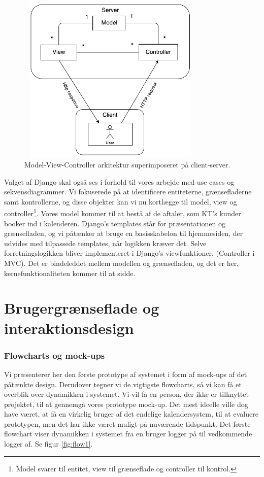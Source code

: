 \documentclass[12pt]{article}   %
\begin{document}
\begin{figure}[!ht]
	\centering
\includegraphics[width=9cm, height=8cm]{mvc.pdf}
\caption{Model-View-Controller arkitektur superimposeret på client-server.}
\label{fig:mvc}
\end{figure}

Valget af Django skal også ses i forhold til vores arbejde med use cases og sekvensdiagrammer. Vi fokuserede på at identificere entiteterne, grænsefladerne samt kontrollerne, og disse objekter kan vi nu kortlægge til model, view og controller\footnote{Model svarer til entitet, view til grænseflade og controller til kontrol.}. Vores model kommer til at bestå af de aftaler, som KT's kunder booker ind i kalenderen. Django's templates står for præsentationen og grænsefladen, og vi påtænker at bruge en basisskabelon til hjemmesiden, der udvides med tilpassede templates, når logikken kræver det. Selve forretningslogikken bliver implementeret i Django's viewfunktioner. (Controller i MVC). Det er bindeleddet mellem modellen og grænsefladen, og det er her, kernefunktionaliteten kommer til at sidde.\\ 

\section{Brugergrænseflade og interaktionsdesign}
\subsubsection{Flowcharts og mock-ups}

Vi præsenterer her den første prototype af systemet i form af mock-ups af det påtænkte design. Derudover tegner vi de vigtigste flowcharts, så vi kan få et overblik over dynamikken i systemet. Vi vil få en person, der ikke er tilknyttet projektet, til at gennemgå vores prototype mock-up. Det mest ideelle ville dog have været, at få en virkelig bruger af det endelige kalendersystem, til at evaluere prototypen, men det har ikke været muligt på nuværende tidspunkt.
Det første flowchart viser dynamikken i systemet fra en bruger logger på til vedkommende logger af. Se figur \ref{fig:flow1}.\\
\end{document}
